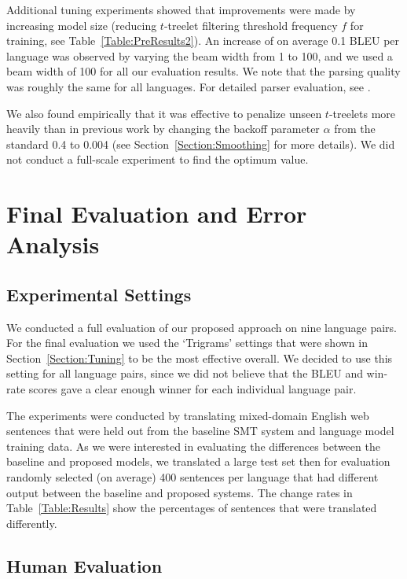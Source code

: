 \documentclass[english]{jnlp_1.4}
\begin{document}
Additional tuning experiments showed that improvements were made by increasing
model size (reducing $t$-treelet filtering threshold frequency $f$ for training,
see Table~\ref{Table:PreResults2}). An increase of on average 0.1 BLEU per language
was observed by varying the beam width from 1 to 100, and we used a beam width
of 100 for all our evaluation results. We note that the parsing quality was roughly
the same for all languages. For detailed parser evaluation, see \cite{Lerner13}.

We also found empirically that it was effective to penalize unseen
$t$-treelets more heavily than in previous work \cite{Brants07} by changing the backoff parameter $\alpha$ from the
standard 0.4 to 0.004 (see Section~\ref{Section:Smoothing} for more details).
We did not conduct a full-scale experiment to find the optimum value.



\section{Final Evaluation and Error Analysis}
\label{Section:Test}

\subsection{Experimental Settings}

We conducted a full evaluation of our proposed approach on nine language pairs.
For the final evaluation we used the `Trigrams' settings that were shown in
Section~\ref{Section:Tuning} to be the most effective overall.
We decided to use this setting for all language pairs, since we did not
believe that the BLEU and win-rate scores gave a clear enough winner
for each individual language pair.

The experiments were conducted by translating mixed-domain English web sentences that
were held out from the baseline SMT system and language model training data.
As we were interested in evaluating the differences between the baseline and
proposed models, we translated a large test set then for evaluation randomly selected
(on average) 400 sentences per language that had different output between the
baseline and proposed systems.
The change rates in Table~\ref{Table:Results} show the percentages of sentences
that were translated differently.


\subsection{Human Evaluation}
\end{document}
